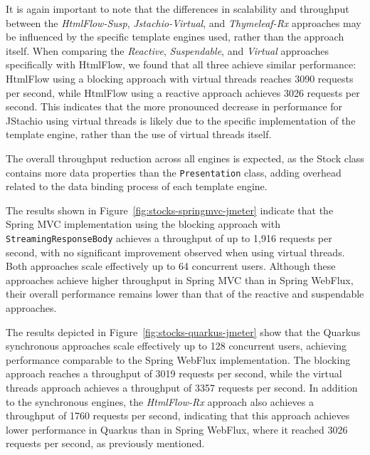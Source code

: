 \documentclass[software,article,accept,pdftex,moreauthors]{Definitions/mdpi}
\begin{document}
It is again important to note that the differences in scalability and
throughput between the \textit{HtmlFlow-Susp}, \textit{Jstachio-Virtual}, and
\textit{Thymeleaf-Rx} approaches may be influenced by the specific template
engines used, rather than the approach itself. When comparing the
\textit{Reactive}, \textit{Suspendable}, and \textit{Virtual} approaches
specifically with HtmlFlow, we found that all three achieve similar
performance: HtmlFlow using a blocking approach with virtual threads reaches
3090 requests per second, while HtmlFlow using a reactive approach achieves
3026 requests per second. This indicates that the more pronounced decrease in
performance for JStachio using virtual threads is likely due to the specific
implementation of the template engine, rather than the use of virtual threads
itself.

The overall throughput reduction across all engines is expected, as the Stock
class contains more data properties than the \texttt{Presentation} class,
adding overhead related to the data binding process of each template engine.



The results shown in Figure~\ref{fig:stocks-springmvc-jmeter} indicate that the
Spring MVC implementation using the blocking approach with
\texttt{StreamingResponseBody} achieves a throughput of up to 1,916 requests
per second, with no significant improvement observed when using virtual
threads. Both approaches scale effectively up to 64 concurrent users. Although
these approaches achieve higher throughput in Spring MVC than in Spring
WebFlux, their overall performance remains lower than that of the reactive and
suspendable approaches.

The results depicted in Figure~\ref{fig:stocks-quarkus-jmeter} show that the
Quarkus synchronous approaches scale effectively up to 128 concurrent users,
achieving performance comparable to the Spring WebFlux implementation. The
blocking approach reaches a throughput of 3019 requests per second, while the
virtual threads approach achieves a throughput of 3357 requests per second. In
addition to the synchronous engines, the \textit{HtmlFlow-Rx} approach also
achieves a throughput of 1760 requests per second, indicating that this
approach achieves lower performance in Quarkus than in Spring WebFlux, where it
reached 3026 requests per second, as previously mentioned.
\end{document}
